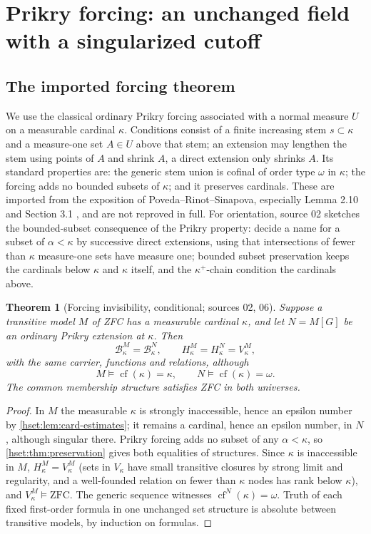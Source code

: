 \documentclass[11pt,letterpaper]{article}
\newtheorem{theorem}{Theorem}[section]
\theoremstyle{definition}
\theoremstyle{remark}
\newcommand{\B}{\mathcal B}
\newcommand{\cf}{\operatorname{cf}}
\newcommand{\ZFC}{\mathrm{ZFC}}
\begin{document}
\section{Prikry forcing: an unchanged field with a singularized cutoff}
\label{hset:sec:prikry}

\subsection{The imported forcing theorem}

We use the classical ordinary Prikry forcing associated with a normal measure
$U$ on a measurable cardinal $\kappa$. Conditions consist of a finite increasing
stem $s\subset\kappa$ and a measure-one set $A\in U$ above that stem; an
extension may lengthen the stem using points of $A$ and shrink $A$, a direct
extension only shrinks $A$. Its standard properties are: the generic stem union
is cofinal of order type $\omega$ in $\kappa$; the forcing adds no bounded
subsets of $\kappa$; and it preserves cardinals. These are imported from the
exposition of Poveda--Rinot--Sinapova, especially Lemma 2.10 and Section 3.1
\cite{PRS}, and are not reproved in full. For orientation, source 02 sketches
the bounded-subset consequence of the Prikry property: decide a name for a
subset of $\alpha<\kappa$ by successive direct extensions, using that
intersections of fewer than $\kappa$ measure-one sets have measure one; bounded
subset preservation keeps the cardinals below $\kappa$ and $\kappa$ itself, and the
$\kappa^+$-chain condition the cardinals above.

\begin{theorem}[Forcing invisibility, conditional; sources 02, 06]
\label{hset:thm:prikry}
Suppose a transitive model $M$ of ZFC has a measurable cardinal $\kappa$, and let
$N=M[G]$ be an ordinary Prikry extension at $\kappa$. Then
\[
 \B_\kappa^M=\B_\kappa^N,\qquad H_\kappa^M=H_\kappa^N=V_\kappa^M,
\]
with the same carrier, functions and relations, although
\[
 M\models\cf(\kappa)=\kappa,
 \qquad N\models\cf(\kappa)=\omega.
\]
The common membership structure satisfies ZFC in both universes.
\end{theorem}
\begin{proof}
In $M$ the measurable $\kappa$ is strongly inaccessible, hence an epsilon number
by \cref{hset:lem:card-estimates}; it remains a cardinal, hence an epsilon
number, in $N$, although singular there. Prikry forcing adds no subset of any
$\alpha<\kappa$, so \cref{hset:thm:preservation} gives both equalities of
structures. Since $\kappa$ is inaccessible in $M$, $H_\kappa^M=V_\kappa^M$ (sets in
$V_\kappa$ have small transitive closures by strong limit and regularity, and a
well-founded relation on fewer than $\kappa$ nodes has rank below $\kappa$), and
$V_\kappa^M\models\ZFC$. The generic sequence witnesses $\cf^N(\kappa)=\omega$.
Truth of each fixed first-order formula in one unchanged set structure is
absolute between transitive models, by induction on formulas.
\end{proof}
\end{document}
